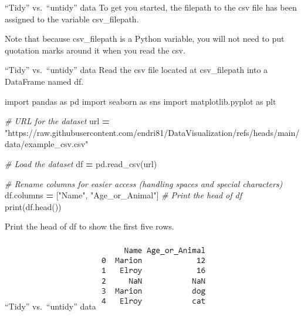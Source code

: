 \documentclass[
  ignorenonframetext,
]{beamer}
\newenvironment{Shaded}{\begin{snugshade}}{\end{snugshade}}
\newcommand{\BuiltInTok}[1]{#1}
\newcommand{\CommentTok}[1]{\textcolor[rgb]{0.56,0.35,0.01}{\textit{#1}}}
\newcommand{\ImportTok}[1]{#1}
\newcommand{\NormalTok}[1]{#1}
\newcommand{\OperatorTok}[1]{\textcolor[rgb]{0.81,0.36,0.00}{\textbf{#1}}}
\newcommand{\StringTok}[1]{\textcolor[rgb]{0.31,0.60,0.02}{#1}}
\begin{document}
\begin{frame}{``Tidy'' vs.~``untidy'' data}
\label{tidy-vs.-untidy-data-1}
To get you started, the filepath to the csv file has been assigned to
the variable csv\_filepath.

Note that because csv\_filepath is a Python variable, you will not need
to put quotation marks around it when you read the csv.
\end{frame}

\begin{frame}[fragile]{``Tidy'' vs.~``untidy'' data}
\label{tidy-vs.-untidy-data-2}
Read the csv file located at csv\_filepath into a DataFrame named df.


\begin{Shaded}
\begin{Highlighting}[]
\ImportTok{import}\NormalTok{ pandas }\ImportTok{as}\NormalTok{ pd}
\ImportTok{import}\NormalTok{ seaborn }\ImportTok{as}\NormalTok{ sns}
\ImportTok{import}\NormalTok{ matplotlib.pyplot }\ImportTok{as}\NormalTok{ plt}

\CommentTok{\# URL for the dataset}
\NormalTok{url }\OperatorTok{=} \StringTok{"https://raw.githubusercontent.com/endri81/DataVisualization/refs/heads/main/data/example\_csv.csv"}

\CommentTok{\# Load the dataset}
\NormalTok{df }\OperatorTok{=}\NormalTok{ pd.read\_csv(url)}

\CommentTok{\# Rename columns for easier access (handling spaces and special characters)}
\NormalTok{df.columns }\OperatorTok{=}\NormalTok{ [}\StringTok{"Name"}\NormalTok{, }\StringTok{"Age\_or\_Animal"}\NormalTok{]}
\CommentTok{\# Print the head of df}
\BuiltInTok{print}\NormalTok{(df.head())}
\end{Highlighting}
\end{Shaded}

Print the head of df to show the first five rows.
\end{frame}

\begin{frame}{``Tidy'' vs.~``untidy'' data}
\label{tidy-vs.-untidy-data-3}
\includegraphics{../images/im256.png}
\end{frame}
\end{document}
